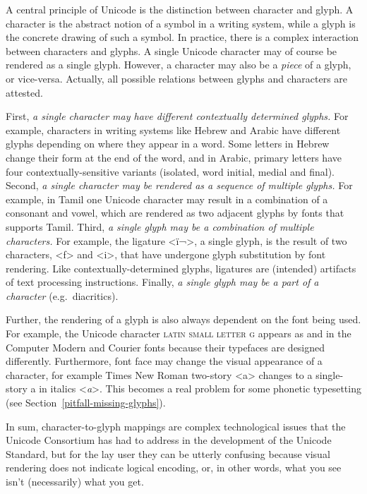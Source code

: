 A central principle of Unicode is the distinction between character and glyph. A
character is the abstract notion of a symbol in a writing system, while a glyph
is the concrete drawing of such a symbol. In practice, there is a complex
interaction between characters and glyphs. A single Unicode character may of
course be rendered as a single glyph. However, a character may also be a
\textit{piece} of a glyph, or vice-versa. Actually, all possible relations
between glyphs and characters are attested.

First, \textit{a single character may have different contextually determined
glyphs.} For example, characters in writing systems like Hebrew and Arabic have
different glyphs depending on where they appear in a word. Some letters in
Hebrew change their form at the end of the word, and in Arabic, primary letters
have four contextually-sensitive variants (isolated, word initial, medial and
final). Second, \textit{a single character may be rendered as a sequence of
multiple glyphs.} For example, in Tamil one Unicode character may result in a
combination of a consonant and vowel, which are rendered as two adjacent glyphs
by fonts that supports Tamil. Third, \textit{a single glyph may be a combination
of multiple characters.} For example, the ligature <ï¬>, a single glyph, is the
result of two characters, <f> and <i>, that have undergone glyph substitution by
font rendering. Like contextually-determined glyphs, ligatures are (intended)
artifacts of text processing instructions. Finally, \textit{a single glyph may
be a part of a character} (e.g.~diacritics).

Further, the rendering of a glyph is also always dependent on the font being
used. For example, the Unicode character \textsc{latin small letter g} appears
as and in the Computer Modern and Courier fonts because their typefaces are
designed differently. Furthermore, font face may change the visual appearance of
a character, for example Times New Roman two-story <a> changes to a single-story
a in italics <\emph{a}>. This becomes a real problem for some phonetic
typesetting (see Section~\ref{pitfall-missing-glyphs}).

In sum, character-to-glyph mappings are complex technological issues that the
Unicode Consortium has had to address in the development of the Unicode
Standard, but for the lay user they can be utterly confusing because visual
rendering does not indicate logical encoding, or, in other words, what you see
isn't (necessarily) what you get.

